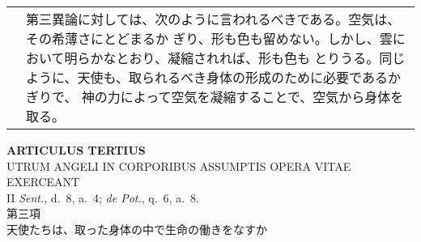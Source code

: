 \documentclass[10pt]{jsarticle} %
\begin{document}
\begin{longtable}{p{21em}p{21em}}
&

第三異論に対しては、次のように言われるべきである。空気は、その希薄さにとどまるか
ぎり、形も色も留めない。しかし、雲において明らかなとおり、凝縮されれば、形も色も
とりうる。同じように、天使も、取られるべき身体の形成のために必要であるかぎりで、
神の力によって空気を凝縮することで、空気から身体を取る。


\end{longtable}
\newpage



\begin{center}
 {\Large {\bf ARTICULUS TERTIUS}}\\
 {\large UTRUM ANGELI IN CORPORIBUS ASSUMPTIS OPERA VITAE EXERCEANT}\\
 {\footnotesize II {\itshape Sent.}, d.~8, a.~4; {\itshape de Pot.},
 q.~6, a.~8.}\\
 {\Large 第三項\\天使たちは、取った身体の中で生命の働きをなすか}
\end{center}
\end{document}
